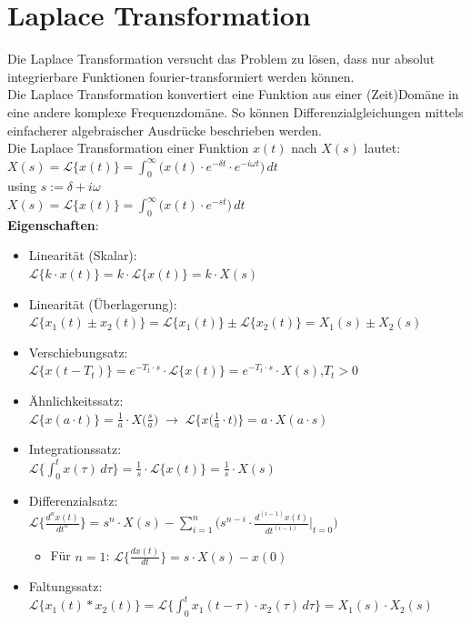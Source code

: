 \documentclass[12pt,a4paper]{article}
\newcommand{\nl}{\\[0.1cm]}
\begin{document}
\section{Laplace Transformation}
Die Laplace Transformation versucht das Problem zu lösen, dass nur absolut integrierbare Funktionen fourier-transformiert werden können.\\
Die Laplace Transformation konvertiert eine Funktion aus einer (Zeit)Domäne in eine andere komplexe Frequenzdomäne. So können Differenzialgleichungen mittels einfacherer algebraischer Ausdrücke beschrieben werden.\\
Die Laplace Transformation einer Funktion $x(t)$ nach $X(s)$ lautet:\nl
$\displaystyle X(s) = \mathcal{L}\{x(t)\} = \int_0^\infty \big( x(t) \cdot e^{-\delta t} \cdot e^{-i\omega t} \big) \, dt$\nl
using $s := \delta + i\omega$\nl
$\displaystyle X(s) = \mathcal{L}\{x(t)\} = \int_0^\infty \big( x(t) \cdot e^{-st} \big) \, dt$\nl
\textbf{Eigenschaften}:
\begin{itemize}
\item Linearität (Skalar):\\ $\mathcal{L}\{k\cdot x(t)\} = k\cdot \mathcal{L}\{x(t)\} = k\cdot X(s)$
\item Linearität (Überlagerung):\\ $\mathcal{L}\{x_1(t) \pm x_2(t)\} = \mathcal{L}\{x_1(t)\} \pm \mathcal{L}\{x_2(t)\} = X_1(s) \pm X_2(s)$
\item Verschiebungsatz:\\ $\mathcal{L}\{x(t-T_t)\} = e^{-T_t\cdot s} \cdot \mathcal{L}\{x(t)\} = e^{-T_t\cdot s}\cdot X(s)$,\quad $T_t > 0$
\item Ähnlichkeitssatz:\\ $\mathcal{L}\{x(a\cdot t)\} = \frac{1}{a} \cdot X\big(\frac{s}{a}\big) \; \rightarrow \; \mathcal{L}\{x\big( \frac{1}{a}\cdot t\big)\} = a\cdot X(a\cdot s)$
\item Integrationssatz:\\ $\displaystyle \mathcal{L}\bigg\{\int_0^t x(\tau)\,d\tau \bigg\} = \frac{1}{s}\cdot \mathcal{L}\{x(t)\} = \frac{1}{s} \cdot X(s)$
\item Differenzialsatz:\\ $\displaystyle\mathcal{L}\bigg\{\frac{d^nx(t)}{dt^n}\bigg\} = s^n\cdot X(s) - \sum_{i=1}^n \bigg(s^{n-i}\cdot \frac{d^{(i-1)}x(t)}{dt^{(i-1)}}\bigg\vert_{t=0}\bigg)$
\begin{itemize}
\item Für $n=1$: $\mathcal{L}\big\{\frac{dx(t)}{dt}\big\} = s\cdot X(s)-x(0)$
\end{itemize}
\item Faltungssatz:\\ $\displaystyle\mathcal{L}\{x_1(t)\ast x_2(t)\} = \mathcal{L}\bigg\{\int_0^t x_1(t-\tau)\cdot x_2(\tau) \, d\tau\bigg\} = X_1(s) \cdot X_2(s)$
\end{itemize}
\end{document}
